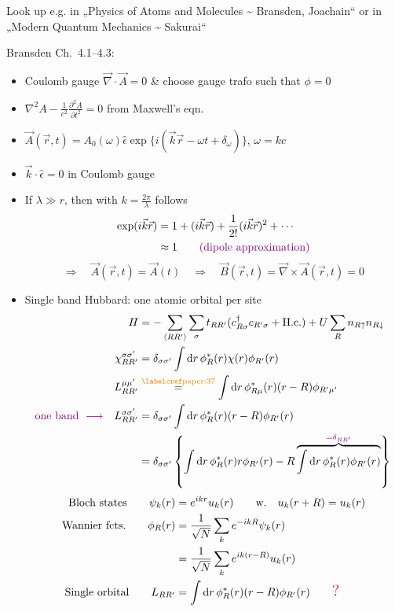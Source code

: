 Look up e.g. in „Physics of Atoms and Molecules \textasciitilde{}
Bransden, Joachain“ or in „Modern Quantum Mechanics
\textasciitilde{} Sakurai“

Bransden Ch.\ 4.1--4.3:

\begin{itemize}
\item Coulomb gauge \(\vec\nabla\cdot\vec A=0\)
\& choose gauge trafo such that \(\phi=0\)

\item \(\displaystyle\nabla^2 A-\frac{1}{c^2}\frac{\partial^2A}{\partial t^2}=0\)
from Maxwell's eqn.

\item \(\vec A(\vec r,t)=A_0(\omega)\hat\epsilon
       \exp\{i(\vec k\vec r-\omega t+\delta_\omega)\}\),
      \(\omega=kc\)

\item \(\vec k\cdot\hat\epsilon=0\) in Coulomb gauge

\item If \(\lambda\gg r\), then with \(k=\frac{2\pi}{\lambda}\) follows
\begin{align*}
\exp(i\vec k\vec r)
 &=1+(i\vec k\vec r)+\frac{1}{2!}(i\vec k\vec r)^2+\cdots\\
 &\approx 1\qquad \textcolor{violet}{\text{(dipole approximation)}}
\end{align*}
\[
\Rightarrow\quad \vec A(\vec r,t)=\vec A(t)
\quad \Rightarrow\quad \vec B(\vec r,t)
   =\vec\nabla\times\vec A(\vec r,t)=0
\]

\item Single band Hubbard: one atomic orbital per site
\begin{align*}
H&=-\sum_{\langle RR'\rangle}\sum_{\sigma}t_{RR'}
     (c^\dagger_{R\sigma}c_{R'\sigma}+\mathrm{H.c.})
     +U\sum_R n_{R\uparrow}n_{R\downarrow}\\
\chi_{RR'}^{\sigma\sigma'}
  &=\delta_{\sigma\sigma'}\int\dint r\,
      \phi^*_R(r)\chi(r)\phi_{R'}(r)\\
L_{RR'}^{\mu\mu'}
  &\overset{\text{\scriptsize\paperref{paper:37}}}{=}
      \int\dint r\,\phi^*_{R\mu}(r)(r-R)\phi_{R'\mu'}\\
\annotation{\text{one band}\ \longrightarrow}\quad L_{RR'}^{\sigma\sigma'}
  &=\delta_{\sigma\sigma'}\int\dint r\,\phi_R^*(r)(r-R)\phi_{R'}(r)\\
  &=\delta_{\sigma\sigma'}
      \left\{\int\dint r\,\phi_R^*(r)r\phi_{R'}(r)
           -R\overbrace{\int\dint r\,\phi_R^*(r)\phi_{R'}(r)}
               ^{\annotation{=\delta_{RR'}}}\right\}
\end{align*}
\begin{align*}
\text{Bloch states}\qquad\psi_k(r)
  &=e^{ikr}u_k(r)\qquad \text{w.}\quad u_k(r+R)=u_k(r)\\
\text{Wannier fcts.}\qquad\phi_R(r)
  &=\frac{1}{\sqrt N}\sum_k e^{-ikR}\psi_k(r)\\
  &=\frac{1}{\sqrt N}\sum_k e^{ik(r-R)}u_k(r)\\
\text{Single orbital}\qquad L_{RR'}
  &=\int\mathop{}\!\mathrm{d} r\,\phi_R^*(r)(r-R)\phi_{R'}(r)
      \qquad\textcolor{red}{\text{\Large ?}}
\end{align*}
\end{itemize}

